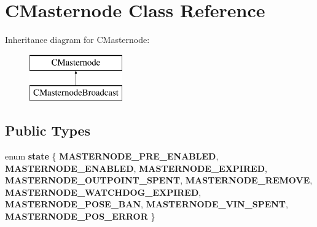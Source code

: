 \hypertarget{class_c_masternode}{}\section{C\+Masternode Class Reference}
\label{class_c_masternode}
Inheritance diagram for C\+Masternode\+:\begin{figure}[H]
\begin{center}
\leavevmode
\includegraphics[height=2.000000cm]{class_c_masternode}
\end{center}
\end{figure}
\subsection*{Public Types}
\begin{DoxyCompactItemize}
\item 
\mbox{\label{class_c_masternode_a958e9e8587729e417d1a529c81bf2eb0}} 
enum {\bfseries state} \{ \newline
{\bfseries M\+A\+S\+T\+E\+R\+N\+O\+D\+E\+\_\+\+P\+R\+E\+\_\+\+E\+N\+A\+B\+L\+ED}, 
{\bfseries M\+A\+S\+T\+E\+R\+N\+O\+D\+E\+\_\+\+E\+N\+A\+B\+L\+ED}, 
{\bfseries M\+A\+S\+T\+E\+R\+N\+O\+D\+E\+\_\+\+E\+X\+P\+I\+R\+ED}, 
{\bfseries M\+A\+S\+T\+E\+R\+N\+O\+D\+E\+\_\+\+O\+U\+T\+P\+O\+I\+N\+T\+\_\+\+S\+P\+E\+NT}, 
\newline
{\bfseries M\+A\+S\+T\+E\+R\+N\+O\+D\+E\+\_\+\+R\+E\+M\+O\+VE}, 
{\bfseries M\+A\+S\+T\+E\+R\+N\+O\+D\+E\+\_\+\+W\+A\+T\+C\+H\+D\+O\+G\+\_\+\+E\+X\+P\+I\+R\+ED}, 
{\bfseries M\+A\+S\+T\+E\+R\+N\+O\+D\+E\+\_\+\+P\+O\+S\+E\+\_\+\+B\+AN}, 
{\bfseries M\+A\+S\+T\+E\+R\+N\+O\+D\+E\+\_\+\+V\+I\+N\+\_\+\+S\+P\+E\+NT}, 
\newline
{\bfseries M\+A\+S\+T\+E\+R\+N\+O\+D\+E\+\_\+\+P\+O\+S\+\_\+\+E\+R\+R\+OR}
 \}
\end{DoxyCompactItemize}
